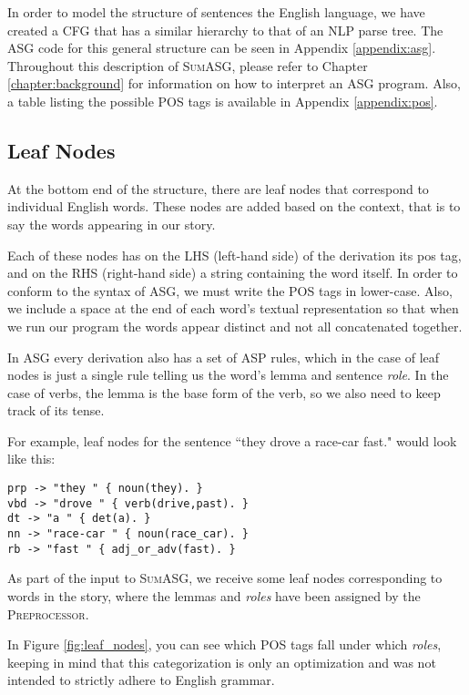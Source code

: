 In order to model the structure of sentences the English language, we have created a CFG that has a similar hierarchy to that of an NLP parse tree. The ASG code for this general structure can be seen in Appendix \ref{appendix:asg}. Throughout this description of \textsc{SumASG}, please refer to Chapter \ref{chapter:background} for information on how to interpret an ASG program. Also, a table listing the possible POS tags is available in Appendix \ref{appendix:pos}.

\subsection{Leaf Nodes}

At the bottom end of the structure, there are leaf nodes that correspond to individual English words. These nodes are added based on the context, that is to say the words appearing in our story.

Each of these nodes has on the LHS (left-hand side) of the derivation its pos tag, and on the RHS (right-hand side) a string containing the word itself. In order to conform to the syntax of ASG, we must write the POS tags in lower-case. Also, we include a space at the end of each word's textual representation so that when we run our program the words appear distinct and not all concatenated together.

In ASG every derivation also has a set of ASP rules, which in the case of leaf nodes is just a single rule telling us the word's lemma and sentence \textit{role}. In the case of verbs, the lemma is the base form of the verb, so we also need to keep track of its tense.

For example, leaf nodes for the sentence ``they drove a race-car fast." would look like this:

\begin{displayquote}
\begin{lstlisting}
prp -> "they " { noun(they). }
vbd -> "drove " { verb(drive,past). }
dt -> "a " { det(a). }
nn -> "race-car " { noun(race_car). }
rb -> "fast " { adj_or_adv(fast). }
\end{lstlisting}
\end{displayquote}

As part of the input to \textsc{SumASG}, we receive some leaf nodes corresponding to words in the story, where the lemmas and \textit{roles} have been assigned by the \textsc{Preprocessor}.

In Figure \ref{fig:leaf_nodes}, you can see which POS tags fall under which \textit{roles}, keeping in mind that this categorization is only an optimization and was not intended to strictly adhere to English grammar.

